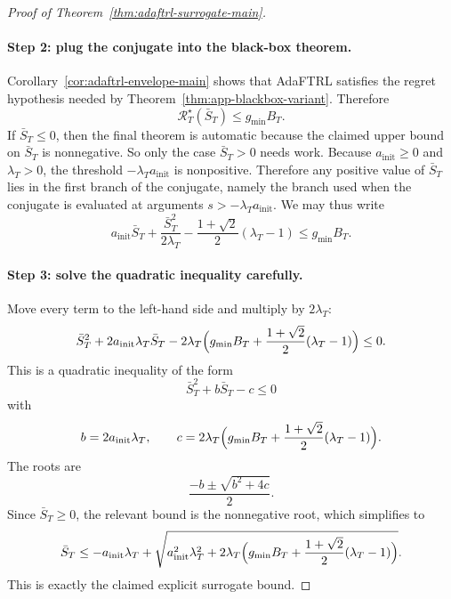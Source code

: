 \documentclass[11pt]{article}
\newcommand{\1}{\mathbf{1}}
\begin{document}
\begin{proof}[Proof of Theorem~\ref{thm:adaftrl-surrogate-main}]
\paragraph{Step 2: plug the conjugate into the black-box theorem.}
Corollary~\ref{cor:adaftrl-envelope-main} shows that AdaFTRL satisfies the regret hypothesis needed by Theorem~\ref{thm:app-blackbox-variant}. Therefore
\[
\mathcal R_T^\star(\bar S_T)\le g_{\min}B_T.
\]
If $\bar S_T\le 0$, then the final theorem is automatic because the claimed upper bound on $\bar S_T$ is nonnegative. So only the case $\bar S_T>0$ needs work.
Because $a_{\mathrm{init}}\ge 0$ and $\lambda_T>0$, the threshold $-\lambda_T a_{\mathrm{init}}$ is nonpositive. Therefore any positive value of $\bar S_T$ lies in the first branch of the conjugate, namely the branch used when the conjugate is evaluated at arguments $s> -\lambda_T a_{\mathrm{init}}$. We may thus write
\[
a_{\mathrm{init}}\bar S_T+\frac{\bar S_T^2}{2\lambda_T}-\frac{1+\sqrt{2}}{2}(\lambda_T-1)\le g_{\min}B_T.
\]

\paragraph{Step 3: solve the quadratic inequality carefully.}
Move every term to the left-hand side and multiply by $2\lambda_T$:
\[
\bar S_T^2+2a_{\mathrm{init}}\lambda_T\bar S_T
-
2\lambda_T\Bigl(g_{\min}B_T+\frac{1+\sqrt{2}}{2}(\lambda_T-1)\Bigr)\le 0.
\]
This is a quadratic inequality of the form
\[
\bar S_T^2+b\bar S_T-c\le 0
\]
with
\[
b=2a_{\mathrm{init}}\lambda_T,
\qquad
c=2\lambda_T\Bigl(g_{\min}B_T+\frac{1+\sqrt{2}}{2}(\lambda_T-1)\Bigr).
\]
The roots are
\[
\frac{-b\pm\sqrt{b^2+4c}}{2}.
\]
Since $\bar S_T\ge 0$, the relevant bound is the nonnegative root, which simplifies to
\[
\bar S_T
\le
-a_{\mathrm{init}}\lambda_T
+
\sqrt{
a_{\mathrm{init}}^2\lambda_T^2
+
2\lambda_T\Bigl(g_{\min}B_T+\frac{1+\sqrt{2}}{2}(\lambda_T-1)\Bigr)
}.
\]
This is exactly the claimed explicit surrogate bound.
\end{proof}
\end{document}
